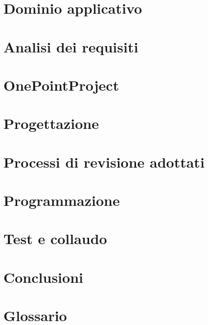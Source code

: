 
%

\def\INDICE		{true} 		%
\def\TABELLE	{true} 		%
\def\FIGURE		{true} 		%



\twocolumn

\newpage



\pagestyle{stilecapitolinumerati}

\section{Dominio applicativo}

\newpage

\section{Analisi dei requisiti}
\label{sec:analisi}

\newpage

\section{OnePointProject}

\newpage

\section{Progettazione}

\newpage

\section{Processi di revisione adottati}

\newpage

\section{Programmazione}

\newpage

\section{Test e collaudo}

\newpage

\section{Conclusioni}

\newpage

\pagestyle{stilecapitolinonnumerati}

\section*{Glossario}

\newpage



